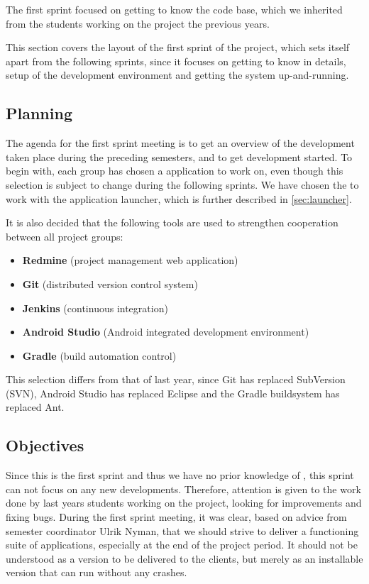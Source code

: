 The first sprint focused on getting to know the \giraf code base, which we inherited from the students working on the project the previous years. 

This section covers the layout of the first sprint of the project, which sets itself apart from the following sprints, since it focuses on getting to know \giraf in details, setup of the development environment and getting the system up-and-running.

\subsection{Planning}\label{sec:sprint1:planning}
The agenda for the first sprint meeting is to get an overview of the development taken place during the preceding semesters, and to get development started.
To begin with, each group has chosen a \giraf application to work on, even though this selection is subject to change during the following sprints.
We have chosen the to work with the application launcher, which is further described in \cref{sec:launcher}.

It is also decided that the following tools are used to strengthen cooperation between all project groups:

\begin{itemize}
\item \textbf{Redmine} (project management web application)
\item \textbf{Git} (distributed version control system)
\item \textbf{Jenkins} (continuous integration)
\item \textbf{Android Studio} (Android integrated development environment)
\item \textbf{Gradle} (build automation control)
\end{itemize}

This selection differs from that of last year, since Git has replaced SubVersion (SVN), Android Studio has replaced Eclipse and the Gradle buildsystem has replaced Ant.

\subsection{Objectives}\label{sec:sprint1:objectives}
Since this is the first sprint and thus we have no prior knowledge of \giraf, this sprint can not focus on any new developments.
Therefore, attention is given to the work done by last years students working on the project, looking for improvements and fixing bugs.
During the first sprint meeting, it was clear, based on advice from semester coordinator Ulrik Nyman, that we should strive to deliver a functioning suite of applications, especially at the end of the project period.
It should not be understood as a version to be delivered to the clients, but merely as an installable version that can run without any crashes. 


